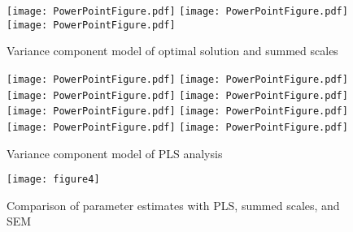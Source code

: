 \documentclass[10pt]{report}
\begin{document}
\pagestyle{empty}
%
%


\begin{figure}[h!]
\centering
\texttt{[image: PowerPointFigure.pdf]}
\texttt{[image: PowerPointFigure.pdf]}
\texttt{[image: PowerPointFigure.pdf]}

\caption{Variance component model of optimal solution and summed scales}
\end{figure}

\begin{figure}[h!]
\centering
\texttt{[image: PowerPointFigure.pdf]}
\texttt{[image: PowerPointFigure.pdf]}
\texttt{[image: PowerPointFigure.pdf]}
\texttt{[image: PowerPointFigure.pdf]}
\texttt{[image: PowerPointFigure.pdf]}
\texttt{[image: PowerPointFigure.pdf]}
\texttt{[image: PowerPointFigure.pdf]}
\texttt{[image: PowerPointFigure.pdf]}
\caption{Variance component model of PLS analysis}
\end{figure}

\begin{figure}[h!]
\centering
\texttt{[image: figure4]}
\caption{Comparison of parameter estimates with PLS, summed scales, and  SEM}
\end{figure}



%
%

\end{document}

